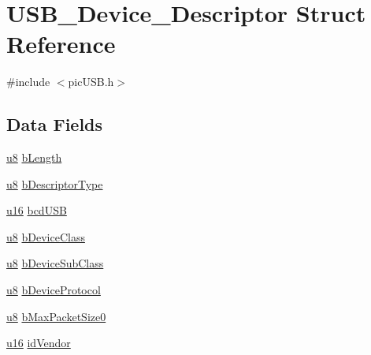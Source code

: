 \hypertarget{struct_u_s_b___device___descriptor}{\section{U\-S\-B\-\_\-\-Device\-\_\-\-Descriptor Struct Reference}
\label{struct_u_s_b___device___descriptor}
}


{\ttfamily \#include $<$pic\-U\-S\-B.\-h$>$}

\subsection*{Data Fields}
\begin{DoxyCompactItemize}
\item 
\hyperlink{p8_2pinguino_2core_2typedef_8h_aed742c436da53c1080638ce6ef7d13de}{u8} \hyperlink{struct_u_s_b___device___descriptor_a904ce9aea3e1db94a9a1ec5a0a22b65d}{b\-Length}
\item 
\hyperlink{p8_2pinguino_2core_2typedef_8h_aed742c436da53c1080638ce6ef7d13de}{u8} \hyperlink{struct_u_s_b___device___descriptor_af6d6c7e334878414c973fc10e54cfb4e}{b\-Descriptor\-Type}
\item 
\hyperlink{p8_2pinguino_2core_2typedef_8h_a50b0d1c7a54fa09a64a3ac111c778520}{u16} \hyperlink{struct_u_s_b___device___descriptor_adec107f638eb1313f918ae1816d70b4f}{bcd\-U\-S\-B}
\item 
\hyperlink{p8_2pinguino_2core_2typedef_8h_aed742c436da53c1080638ce6ef7d13de}{u8} \hyperlink{struct_u_s_b___device___descriptor_a2f8fee89c530db85ad73a73dde2ffe6b}{b\-Device\-Class}
\item 
\hyperlink{p8_2pinguino_2core_2typedef_8h_aed742c436da53c1080638ce6ef7d13de}{u8} \hyperlink{struct_u_s_b___device___descriptor_a5082b67cfc876ba2828ed925b05c9f33}{b\-Device\-Sub\-Class}
\item 
\hyperlink{p8_2pinguino_2core_2typedef_8h_aed742c436da53c1080638ce6ef7d13de}{u8} \hyperlink{struct_u_s_b___device___descriptor_a4dd44af3eaf7355f5699fc2fbf1bcb2f}{b\-Device\-Protocol}
\item 
\hyperlink{p8_2pinguino_2core_2typedef_8h_aed742c436da53c1080638ce6ef7d13de}{u8} \hyperlink{struct_u_s_b___device___descriptor_ad89d746ea974362fa15ab646fdcb5c61}{b\-Max\-Packet\-Size0}
\item 
\hyperlink{p8_2pinguino_2core_2typedef_8h_a50b0d1c7a54fa09a64a3ac111c778520}{u16} \hyperlink{struct_u_s_b___device___descriptor_a7a7c71d161c32f997811107e4d546ca8}{id\-Vendor}

\end{DoxyCompactItemize}
